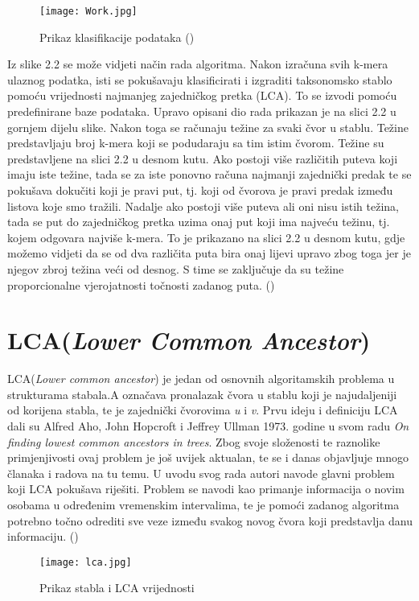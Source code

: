 \documentclass[times, utf8, zavrsni]{fer}
\begin{document}
\begin{figure}[!htbp]
	\centering
	\texttt{[image: Work.jpg]}
	\caption{Prikaz klasifikacije podataka (\cite{Kraken})}
	\label{Klasifikacija}
\end{figure}

Iz slike 2.2 se može vidjeti način rada algoritma. Nakon izračuna svih  k-mera ulaznog podatka, isti se pokušavaju klasificirati i izgraditi taksonomsko stablo pomoću vrijednosti najmanjeg zajedničkog pretka (LCA). To se izvodi pomoću predefinirane baze podataka. Upravo opisani dio rada prikazan je na slici 2.2  u gornjem dijelu slike. Nakon toga se računaju težine za svaki čvor u stablu. Težine predstavljaju broj k-mera koji se podudaraju sa tim istim čvorom. Težine su predstavljene na slici 2.2 u desnom kutu. Ako postoji više različitih puteva koji imaju iste težine, tada se za iste ponovno računa najmanji zajednički predak te se pokušava dokučiti koji je pravi put, tj. koji od čvorova je pravi predak između listova koje smo tražili. Nadalje ako postoji više puteva ali oni nisu istih težina, tada se put do zajedničkog pretka uzima onaj put koji ima najveću težinu, tj. kojem odgovara najviše k-mera. To je prikazano na slici 2.2 u desnom kutu, gdje možemo vidjeti da se od dva različita puta bira onaj lijevi upravo zbog toga jer je njegov zbroj težina veći od desnog. S time se zaključuje da su težine proporcionalne vjerojatnosti točnosti zadanog puta. (\cite{Kraken})


\section{LCA(\textit{Lower Common Ancestor})}
LCA(\textit{Lower common ancestor}) je jedan od osnovnih algoritamskih problema u strukturama stabala.A označava pronalazak čvora u stablu koji je najudaljeniji od korijena stabla, te je zajednički čvorovima \textit{u} i \textit{v}. Prvu ideju i definiciju LCA dali su Alfred Aho, John Hopcroft i Jeffrey Ullman 1973. godine u svom radu \textit{On finding lowest common ancestors in trees}. Zbog svoje složenosti te raznolike primjenjivosti ovaj problem je još uvijek aktualan, te se i danas objavljuje mnogo članaka i radova na tu temu. U uvodu svog rada autori navode glavni problem koji LCA pokušava riješiti. Problem se navodi kao primanje informacija o novim osobama u određenim vremenskim intervalima, te je pomoći zadanog algoritma potrebno točno odrediti sve veze između svakog novog čvora koji predstavlja danu informaciju. (\cite{lca1})
\begin{figure}[!htbp]
	\centering
	\texttt{[image: lca.jpg]}
	\caption{Prikaz stabla i LCA vrijednosti}
	\label{LCA}
\end{figure}
\end{document}

